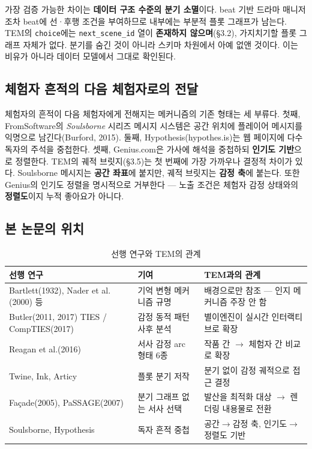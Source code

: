 \documentclass[11pt, a4paper]{article}
\begin{document}
가장 검증 가능한 차이는 \textbf{데이터 구조 수준의 분기 소멸}이다. beat 기반 드라마 매니저조차 beat에 선·후행 조건을 부여하므로 내부에는 부분적 플롯 그래프가 남는다. TEM의 \texttt{choice}에는 \texttt{next\_scene\_id} 열이 \textbf{존재하지 않으며}(\S3.2), 가지치기할 플롯 그래프 자체가 없다. 분기를 숨긴 것이 아니라 스키마 차원에서 아예 없앤 것이다. 이는 비유가 아니라 데이터 모델에서 그대로 확인된다.

\subsection{체험자 흔적의 다음 체험자로의 전달}

체험자의 흔적이 다음 체험자에게 전해지는 메커니즘의 기존 형태는 세 부류다. 첫째, FromSoftware의 \textit{Soulsborne} 시리즈 메시지 시스템은 공간 위치에 플레이어 메시지를 익명으로 남긴다(Burford, 2015). 둘째, Hypothesis(hypothes.is)는 웹 페이지에 다수 독자의 주석을 중첩한다. 셋째, Genius.com은 가사에 해석을 중첩하되 \textbf{인기도 기반}으로 정렬한다. TEM의 궤적 브릿지(\S3.5)는 첫 번째에 가장 가까우나 결정적 차이가 있다. Soulsborne 메시지는 \textbf{공간 좌표}에 붙지만, 궤적 브릿지는 \textbf{감정 축}에 붙는다. 또한 Genius의 인기도 정렬을 명시적으로 거부한다 --- 노출 조건은 체험자 감정 상태와의 \textbf{정렬도}이지 누적 좋아요가 아니다.

\subsection{본 논문의 위치}

\begin{table}[H]
\centering
\caption{선행 연구와 TEM의 관계}
\small
\begin{tabular}{p{4.6cm} p{4.0cm} p{5.2cm}}
\toprule
\textbf{선행 연구} & \textbf{기여} & \textbf{TEM과의 관계} \\
\midrule
Bartlett(1932), Nader et al.(2000) 등 & 기억 변형 메커니즘 규명 & 배경으로만 참조 --- 인지 메커니즘 주장 안 함 \\
Butler(2011, 2017) TIES / CompTIES(2017) & 감정 동적 패턴 사후 분석 & 별이엔진이 실시간 인터랙티브로 확장 \\
Reagan et al.(2016) & 서사 감정 arc 형태 6종 & 작품 간 $\rightarrow$ 체험자 간 비교로 확장 \\
Twine, Ink, Articy & 플롯 분기 저작 & 분기 없이 감정 궤적으로 접근 결정 \\
Façade(2005), PaSSAGE(2007) & 분기 그래프 없는 서사 선택 & 발산을 최적화 대상 $\rightarrow$ 렌더링 내용물로 전환 \\
Soulsborne, Hypothesis & 독자 흔적 중첩 & 공간$\rightarrow$감정 축, 인기도$\rightarrow$정렬도 기반 \\
\bottomrule
\end{tabular}
\end{table}
\end{document}
